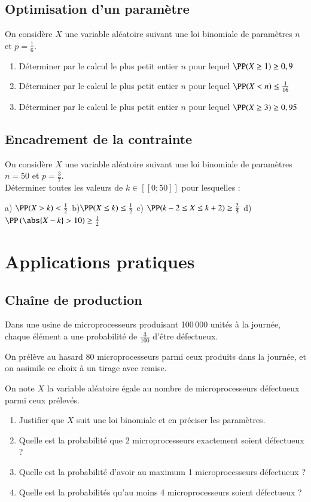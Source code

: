 \documentclass[oneside,12pt]{article}          %
\begin{document}
\subsection{Optimisation d'un paramètre}
On considère $X$ une variable aléatoire suivant une loi binomiale de paramètres $n$ et $p=\frac{1}{6}$. 
\begin{enumerate}
	\item Déterminer par le calcul le plus petit entier $n$ pour lequel $\PP(X\geq1)\geq0,9$
	\item Déterminer par le calcul le plus petit entier $n$ pour lequel $\PP(X<n)\leq\frac{1}{16}$
	\item[\faCalculator] Déterminer par le calcul le plus petit entier $n$ pour lequel $\PP(X\geq3)\geq0,95$
\end{enumerate}



\subsection{Encadrement de la contrainte}
On considère $X$ une variable aléatoire suivant une loi binomiale de paramètres $n=50$ et $p=\frac{3}{7}$. \\
Déterminer toutes les valeurs de $k\in [\![0;50]\!]$ pour lesquelles :

a) $\PP(X>k)<\frac{1}{2}$ \qquad b)$\PP(X\leq k) \leq \frac{1}{2}$ \qquad c) $\PP(k-2\leq X \leq k+2)\geq\frac{2}{5}$ \qquad d) $\PP\left(\abs{X-k}>10\right)\geq\frac{1}{2}$




\section{Applications pratiques}



\subsection{Chaîne de production}
Dans une usine de microprocesseurs produisant 100\,000 unités à la journée, chaque élément a une probabilité de $\frac{3}{100}$  d'être défectueux. 

On prélève au hasard 80 microprocesseurs parmi ceux produits dans la journée, et on assimile ce choix à un tirage avec remise.

On note $X$ la variable aléatoire égale au nombre de microprocesseurs défectueux parmi ceux prélevés.
\begin{enumerate}
	\item Justifier que $X$ suit une loi binomiale et en préciser les paramètres.
    \item Quelle est la probabilité que 2 microprocesseurs exactement soient défectueux ?
    \item Quelle est la probabilité d'avoir au maximum 1 microprocesseurs défectueux ?
    \item Quelle est la probabilités qu'au moins 4 microprocesseurs soient défectueux ?
\end{enumerate}
\end{document}
